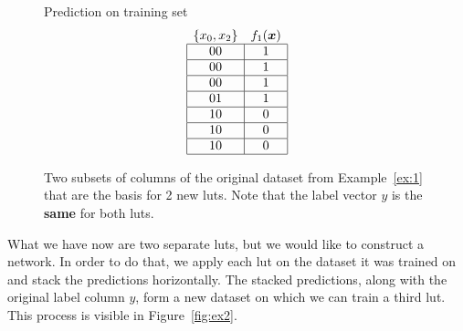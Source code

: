 \begin{figure}[!htb]
\begin{minipage}{.95\linewidth}
\begin{minipage}[b]{.21\linewidth}
      \vspace{1em}
    Prediction on training set
    \vspace{-0.5em}
    \begin{align*}
      \begin{array}{cc}
        \{x_0,x_2\}                    & f_1(\bm{x})              \\ \hline
        \multicolumn{1}{|c|}{00} & \multicolumn{1}{c|}{1} \\ \hline
        \multicolumn{1}{|c|}{00} & \multicolumn{1}{c|}{1} \\ \hline
        \multicolumn{1}{|c|}{00} & \multicolumn{1}{c|}{1} \\ \hline
        \multicolumn{1}{|c|}{01} & \multicolumn{1}{c|}{1} \\ \hline
        \multicolumn{1}{|c|}{10} & \multicolumn{1}{c|}{0} \\ \hline
        \multicolumn{1}{|c|}{10} & \multicolumn{1}{c|}{0} \\ \hline
        \multicolumn{1}{|c|}{10} & \multicolumn{1}{c|}{0} \\ \hline
      \end{array}
    \end{align*}
  \end{minipage}
\end{minipage}
  \normalfont
  \caption{Two subsets of columns of the original dataset from Example~\ref{ex:1} that are the basis for 2 new luts. Note that the label vector $y$ is the \textbf{same} for both luts.}
    \label{fig:ex1}
\end{figure}
\FloatBarrier

\noindent What we have now are two separate luts, but we would like to construct a network. In order to do that, we apply each lut on the dataset it was trained on and stack the predictions horizontally. The stacked predictions, along with the original label column $y$, form a new dataset on which we can train a third lut. This process is visible in Figure~\ref{fig:ex2}.

